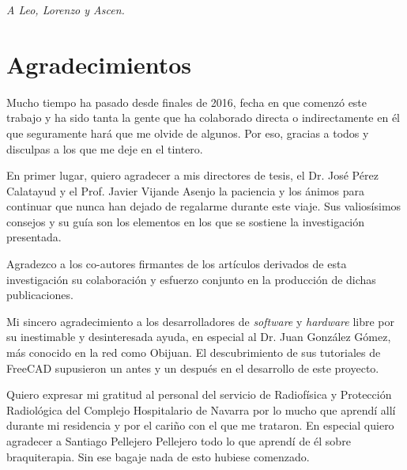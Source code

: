 \newpage
\thispagestyle{empty}
\begin{flushright}
\end{flushright}

\newpage
\thispagestyle{empty}
\begin{flushright}
    \emph{A Leo, Lorenzo y Ascen.}
\end{flushright}


\newpage
\thispagestyle{empty}
\begin{flushright}
\end{flushright}



\hypertarget{Agradecimientos}{%
\chapter*{Agradecimientos}\label{agradecimientos}}


Mucho tiempo ha pasado desde finales de 2016, fecha en que comenzó este trabajo y ha sido tanta la gente que ha colaborado directa o indirectamente en él que seguramente hará que me olvide de algunos. Por eso, gracias a todos y disculpas a los que me deje en el tintero.

En primer lugar, quiero agradecer a mis directores de tesis, el Dr. José Pérez Calatayud y el Prof. Javier Vijande Asenjo la paciencia y los ánimos para continuar que nunca han dejado de regalarme durante este viaje. Sus valiosísimos consejos y su guía son los elementos en los que se sostiene la investigación presentada.         

Agradezco a los co-autores firmantes de los artículos derivados de esta investigación su colaboración y esfuerzo conjunto en la producción de dichas publicaciones.

Mi sincero agradecimiento a los desarrolladores de \textit{software} y \textit{hardware} libre por su inestimable y desinteresada ayuda, en especial al Dr. Juan González Gómez, más conocido en la red como Obijuan. El descubrimiento de sus tutoriales de FreeCAD supusieron un antes y un después en el desarrollo de este proyecto.   

Quiero expresar mi gratitud al personal del servicio de Radiofísica y Protección Radiológica del Complejo Hospitalario de Navarra por lo mucho que aprendí allí durante mi residencia y por el cariño con el que me trataron. En especial quiero agradecer a Santiago Pellejero Pellejero todo lo que aprendí de él sobre braquiterapia. Sin ese bagaje nada de esto hubiese comenzado.

